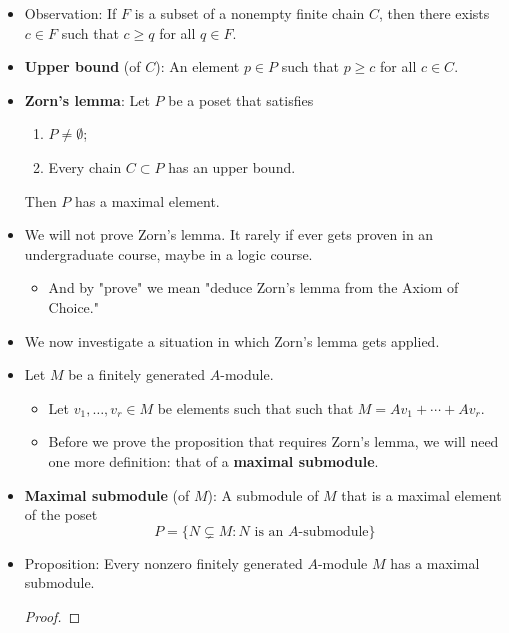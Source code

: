 \documentclass[../notes.tex]{subfiles}
\begin{document}
\begin{itemize}
    \item Observation: If $F$ is a subset of a nonempty finite chain $C$, then there exists $c\in F$ such that $c\geq q$ for all $q\in F$.
    \item \textbf{Upper bound} (of $C$): An element $p\in P$ such that $p\geq c$ for all $c\in C$.
    \item \textbf{Zorn's lemma}: Let $P$ be a poset that satisfies
    \begin{enumerate}[label={(\roman*)}]
        \item $P\neq\emptyset$;
        \item Every chain $C\subset P$ has an upper bound.
    \end{enumerate}
    Then $P$ has a maximal element.
    \item We will not prove Zorn's lemma. It rarely if ever gets proven in an undergraduate course, maybe in a logic course.
    \begin{itemize}
        \item And by "prove" we mean "deduce Zorn's lemma from the Axiom of Choice."
    \end{itemize}
    \item We now investigate a situation in which Zorn's lemma gets applied.
    \item Let $M$ be a finitely generated $A$-module.
    \begin{itemize}
        \item Let $v_1,\dots,v_r\in M$ be elements such that such that $M=Av_1+\cdots+Av_r$.
        \item Before we prove the proposition that requires Zorn's lemma, we will need one more definition: that of a \textbf{maximal submodule}.
    \end{itemize}
    \item \textbf{Maximal submodule} (of $M$): A submodule of $M$ that is a maximal element of the poset
    \begin{equation*}
        P = \{N\subsetneq M:N\text{ is an }A\text{-submodule}\}
    \end{equation*}
    \item Proposition: Every nonzero finitely generated $A$-module $M$ has a maximal submodule.
    \begin{proof}

\end{proof}
\end{itemize}
\end{document}

